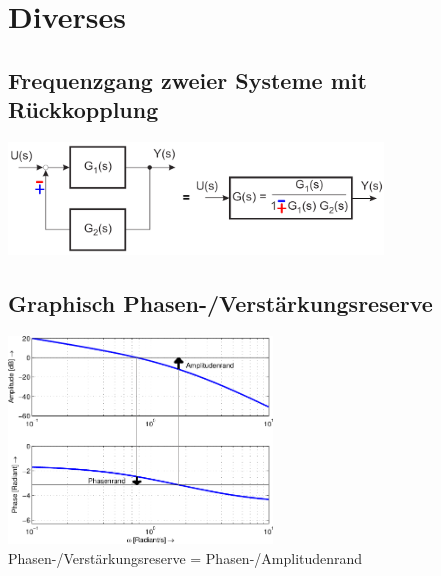 \section{Diverses}
	\subsection{Frequenzgang zweier Systeme mit Rückkopplung }
			\begin{center}
        		\includegraphics[height=3cm]{./bilder/feedback.png}
        	\end{center}

	\subsection{Graphisch Phasen-/Verstärkungsreserve}
		\includegraphics[width=7cm]{./bilder/bode-stabilitaet.png} \\
		Phasen-/Verstärkungsreserve = Phasen-/Amplitudenrand
		
		
\newpage
